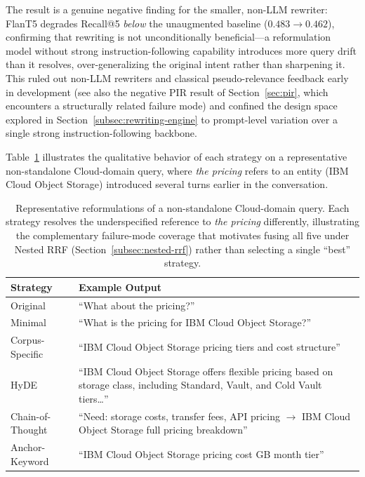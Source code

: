 The result is a genuine negative finding for the smaller, non-LLM rewriter: FlanT5 degrades
Recall@5 \emph{below} the unaugmented baseline ($0.483 \rightarrow 0.462$), confirming that
rewriting is not unconditionally beneficial---a reformulation model without strong instruction-following
capability introduces more query drift than it resolves, over-generalizing the original intent rather
than sharpening it. This ruled out non-LLM rewriters and classical pseudo-relevance feedback early in
development (see also the negative PIR result of Section~\ref{sec:pir}, which encounters a structurally
related failure mode) and confined the design space explored in Section~\ref{subsec:rewriting-engine}
to prompt-level variation over a single strong instruction-following backbone.

Table~\ref{tab:rewrite-example-en} illustrates the qualitative behavior of each strategy on a
representative non-standalone Cloud-domain query, where \textit{the pricing} refers to an entity
(IBM Cloud Object Storage) introduced several turns earlier in the conversation.

\begin{table}[h]
\centering
\small
\begin{tabular}{p{2.6cm}p{9.6cm}}
\toprule
\textbf{Strategy} & \textbf{Example Output} \\
\midrule
Original & ``What about the pricing?'' \\
Minimal & ``What is the pricing for IBM Cloud Object Storage?'' \\
Corpus-Specific & ``IBM Cloud Object Storage pricing tiers and cost structure'' \\
HyDE & ``IBM Cloud Object Storage offers flexible pricing based on storage class, including Standard, Vault, and Cold Vault tiers\ldots'' \\
Chain-of-Thought & ``Need: storage costs, transfer fees, API pricing $\rightarrow$ IBM Cloud Object Storage full pricing breakdown'' \\
Anchor-Keyword & ``IBM Cloud Object Storage pricing cost GB month tier'' \\
\bottomrule
\end{tabular}
\caption{Representative reformulations of a non-standalone Cloud-domain query. Each strategy resolves
the underspecified reference to \textit{the pricing} differently, illustrating the complementary
failure-mode coverage that motivates fusing all five under Nested RRF (Section~\ref{subsec:nested-rrf})
rather than selecting a single ``best'' strategy.}
\label{tab:rewrite-example-en}
\end{table}

